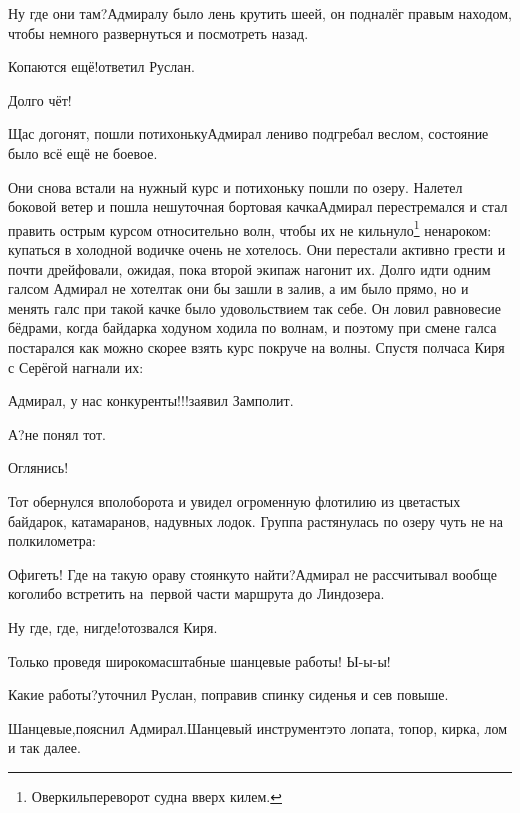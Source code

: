 \diagdash Ну где они там?\mdash Адмиралу было лень крутить шеей, он подналёг правым находом, чтобы немного развернуться и посмотреть назад.

\diagdash Копаются ещё!\mdash ответил Руслан.

\diagdash Долго чёт!

\diagdash Щас догонят, пошли потихоньку\myldots{}\mdash Адмирал лениво подгребал веслом, состояние было всё ещё не боевое.

\renewcommand*{\thefootnote}{\fnsymbol{footnote}}
\setcounter{footnote}{0}
Они снова встали на нужный курс и потихоньку пошли по озеру. Налетел боковой ветер и пошла нешуточная бортовая качка\mdash Адмирал перестремался и стал править острым курсом относительно волн, чтобы их не кильнуло\footnote{Оверкиль\mdash переворот судна вверх килем.} ненароком: купаться в холодной водичке очень не хотелось. Они перестали активно грести и почти дрейфовали, ожидая, пока второй экипаж нагонит их. Долго идти одним галсом Адмирал не хотел\mdash так они бы зашли в залив, а им было прямо, но и менять галс при такой качке было удовольствием так себе. Он ловил равновесие бёдрами, когда байдарка ходуном ходила по волнам, и поэтому при смене галса постарался как можно скорее взять курс покруче на волны. Спустя полчаса Киря с Серёгой нагнали их:


\diagdash Адмирал, у нас конкуренты!!!\mdash заявил Замполит.

\diagdash А?\mdash не понял тот.

\diagdash Оглянись!

Тот обернулся вполоборота и увидел огроменную флотилию из цветастых байдарок, катамаранов, надувных лодок. Группа растянулась по озеру чуть не на полкилометра: 

\diagdash Офигеть! Где на такую ораву стоянку\sdash то найти?\mdash Адмирал не рассчитывал вообще кого\sdash либо встретить на~первой части маршрута до Линдозера.

\diagdash Ну где, где, нигде!\mdash отозвался Киря. 

\diagdash Только проведя широкомасштабные шанцевые работы! Ы-ы-ы!

\diagdash Какие работы?\mdash уточнил Руслан, поправив спинку сиденья и сев повыше.

\diagdash Шанцевые,\mdash пояснил Адмирал.\mdash Шанцевый инструмент\mdash это лопата, топор, кирка, лом и так далее.

